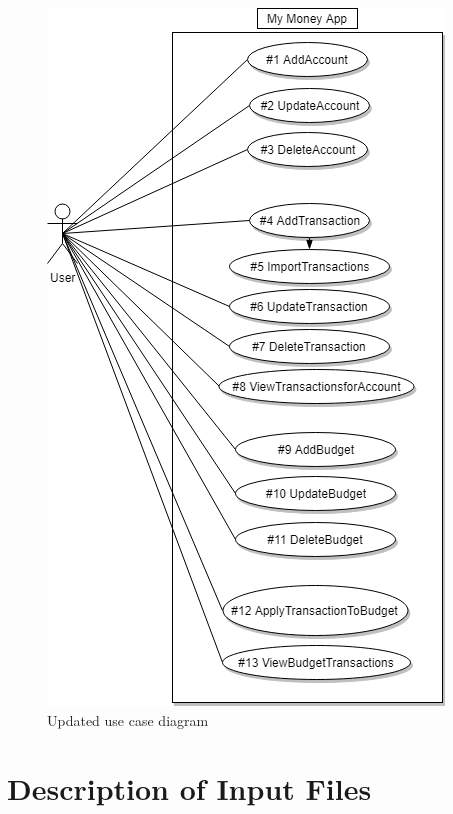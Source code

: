\documentclass[12pt]{article}
\begin{document}
\begin{figure}[H]
\centering
\caption{Updated use case diagram}
\includegraphics[scale=0.5]{Diagrams/UML/SOEN.png}
\end{figure}

\section{Description of Input Files}
\end{document}

